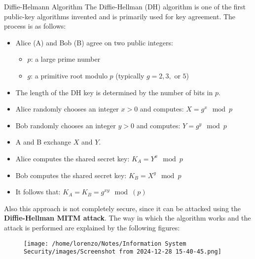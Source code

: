 \vspace{-0.2cm}
\noindent
\begin{center}
\begin{quotebox-yellow}{Diffie-Helmann Algorithm}
    The Diffie-Hellman (DH) algorithm is one of the first public-key algorithms invented and is primarily used for key agreement. The process is as follows:

    \begin{itemize}
        \item Alice (A) and Bob (B) agree on two public integers:
        \begin{itemize}
            \item \( p \): a large prime number
            \item \( g \): a primitive root modulo \( p \) (typically \( g = 2, 3, \) or \( 5 \))
        \end{itemize}
        \item The length of the DH key is determined by the number of bits in \( p \).
        \item Alice randomly chooses an integer \( x > 0 \) and computes:
        \(
        X = g^x \mod p
        \)
        \item Bob randomly chooses an integer \( y > 0 \) and computes:
        \(
        Y = g^y \mod p
        \)
        \item A and B exchange \( X \) and \( Y \).
        \item Alice computes the shared secret key:
        \(
        K_A = Y^x \mod p
        \)
        \item Bob computes the shared secret key:
        \(
        K_B = X^y \mod p
        \)
        \item It follows that:
        \(
        K_A = K_B = g^{xy} \mod (p)
        \)
    \end{itemize}
    Also this approach is not completely secure, since it can be
    attacked using the \textbf{Diffie-Hellman MITM attack}. The way in which the algorithm works and the attack is performed are explained by the following figures:
    \begin{figure}[H]
        \centering
        \vspace{-0.1cm}
        \texttt{[image: /home/lorenzo/Notes/Information System Security/images/Screenshot from 2024-12-28 15-40-45.png]}
    \end{figure}
\end{quotebox-yellow}
\end{center}

